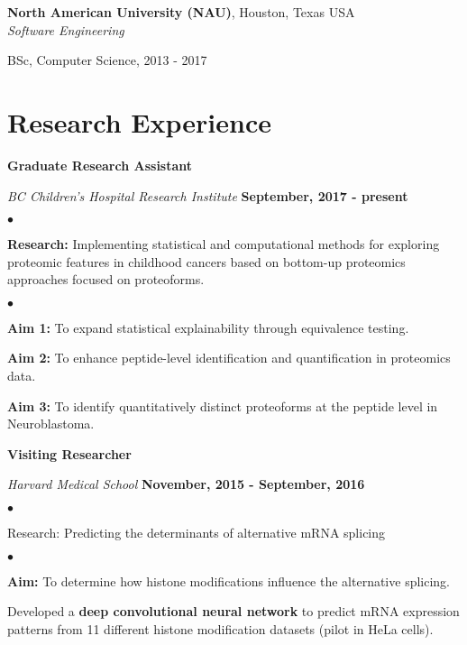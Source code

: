 \documentclass[margin,line]{res}
\newenvironment{list1}{
  \begin{list}{\ding{113}}{%
      \setlength{\itemsep}{0in}
      \setlength{\parsep}{0in} \setlength{\parskip}{0in}
      \setlength{\topsep}{0in} \setlength{\partopsep}{0in}
      \setlength{\leftmargin}{0.17in}}}{\end{list}}
\newenvironment{list2}{
  \begin{list}{$\bullet$}{%
      \setlength{\itemsep}{0in}
      \setlength{\parsep}{0in} \setlength{\parskip}{0in}
      \setlength{\topsep}{0in} \setlength{\partopsep}{0in}
      \setlength{\leftmargin}{0.2in}}}{\end{list}}
\begin{document}
\begin{resume}
{\bf North American University (NAU)}, Houston, Texas USA\\
{\em Software Engineering}
\begin{list1}
\item[] BSc, Computer Science,  2013 - 2017
\end{list1}


\section{\sc Research Experience}

{\bf Graduate Research Assistant}

\vspace{-.3cm}
{\em BC Children's Hospital Research Institute} \hfill {\bf September, 2017 - present}\\
\vspace{-.3cm}
\begin{list2}
\item {\bf Research:} Implementing statistical and computational methods for exploring proteomic features in childhood cancers based on bottom-up proteomics approaches focused on proteoforms.
\begin{list2}
\item {\bf Aim 1:} To expand statistical explainability through equivalence testing.
\item {\bf Aim 2:} To enhance peptide-level identification and quantification in proteomics data.
\item {\bf Aim 3:} To identify quantitatively distinct proteoforms at the peptide level in Neuroblastoma.
\end{list2}
\end{list2}

{\bf Visiting Researcher}

\vspace{-.3cm}
{\em Harvard Medical School} \hfill {\bf November, 2015 - September, 2016}\\
\vspace{-.3cm}
\begin{list2}
\item Research: Predicting the determinants of alternative mRNA splicing
\begin{list2}
\item {\bf Aim:} To determine how histone modifications influence the alternative splicing.
\item Developed a {\bf deep convolutional neural network} to predict mRNA expression patterns from 11 different histone modification datasets (pilot in HeLa cells).


\end{list2}
\end{list2}
\end{resume}
\end{document}
